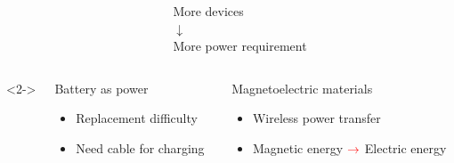 \documentclass[compress]{beamer}
\begin{document}
\begin{frame}
{\begin{columns}[totalwidth=\textwidth]
\begin{column}{.75\textwidth}
   \end{column}
   \begin{column}{.24\textwidth}
   \centering
   More devices \\ [0.2cm]
   {\color{red} \Huge$\mathbf{\downarrow}$} \\ [0.2cm]
    More power requirement \\ [0.2cm]
   \end{column}
\end{columns}
}
\begin{columns}[totalwidth=\textwidth]<2->
   \begin{column}{.40\textwidth} 
   \begin{alertblock}{Battery as power}
	\begin{itemize}[label=$\boxed{\color{red} \times}$, font=\small, leftmargin=*]
	\item Replacement difficulty
	\item Need cable for charging
	\end{itemize}
	\end{alertblock}
   \end{column}
   \begin{column}{.56\textwidth}
       \begin{exampleblock}{Magnetoelectric materials}
	\begin{itemize}[label=$\boxed{\color{green} \checkmark}$, font=\small, leftmargin=*]
	\item Wireless power transfer
	\item Magnetic energy ${\color{red} \rightarrow}$ Electric energy
	\end{itemize}
	\end{exampleblock}
   \end{column}
\end{columns}
\end{frame}
\end{document}
